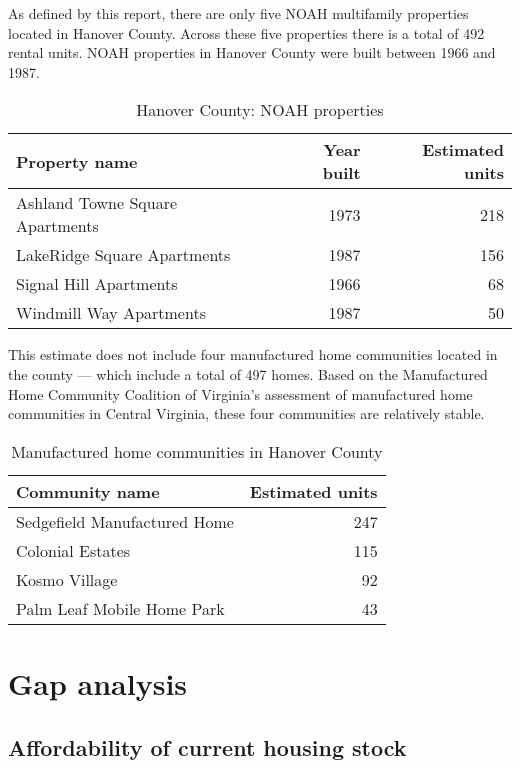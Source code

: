 \documentclass[
  letterpaper,
  DIV=11,
  numbers=noendperiod]{scrreprt}
\begin{document}
As defined by this report, there are only five NOAH multifamily
properties located in Hanover County. Across these five properties there
is a total of 492 rental units. NOAH properties in Hanover County were
built between 1966 and 1987.

\hypertarget{tbl-noah}{}
\begin{table}
\caption{\label{tbl-noah}Hanover County: NOAH properties }\tabularnewline

\centering
\begin{tabular}{l|r|r}
\hline
Property name & Year built & Estimated units\\
\hline
Ashland Towne Square Apartments & 1973 & 218\\
\hline
LakeRidge Square Apartments & 1987 & 156\\
\hline
Signal Hill Apartments & 1966 & 68\\
\hline
Windmill Way Apartments & 1987 & 50\\
\hline
\end{tabular}
\end{table}

This estimate does not include four manufactured home communities
located in the county --- which include a total of 497 homes. Based on
the Manufactured Home Community Coalition of Virginia's assessment of
manufactured home communities in Central Virginia, these four
communities are relatively stable.

\hypertarget{tbl-mhccv}{}
\begin{table}
\caption{\label{tbl-mhccv}Manufactured home communities in Hanover County }\tabularnewline

\centering
\begin{tabular}{l|r}
\hline
Community name & Estimated units\\
\hline
Sedgefield Manufactured Home & 247\\
\hline
Colonial Estates & 115\\
\hline
Kosmo Village & 92\\
\hline
Palm Leaf Mobile Home Park & 43\\
\hline
\end{tabular}
\end{table}

\hypertarget{gap-analysis-3}{%
\section{Gap analysis}\label{gap-analysis-3}}

\hypertarget{affordability-of-current-housing-stock-3}{%
\subsection{Affordability of current housing
stock}\label{affordability-of-current-housing-stock-3}}
\end{document}

